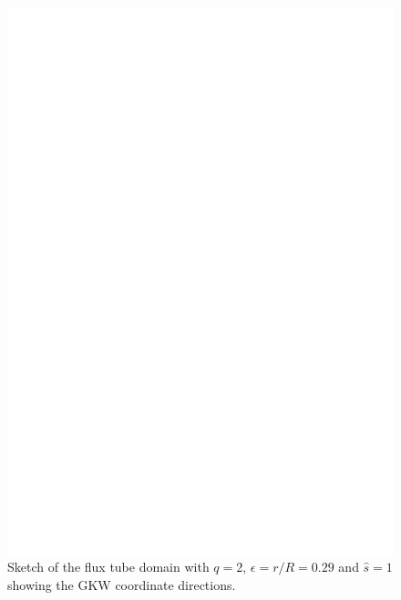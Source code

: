 \documentclass[a4paper,10pt]{article}
\begin{document}
\begin{figure}[hb!]
 \begin{center}
 \includegraphics[scale=0.3]{flux_tube.eps}
\caption{Sketch of the flux tube domain with $q=2$, $\epsilon=r/R=0.29$ and $\hat{s}=1$ showing the GKW coordinate directions.} 
 \label{fig.domain}
\end{center}
\end{figure}
\end{document}
